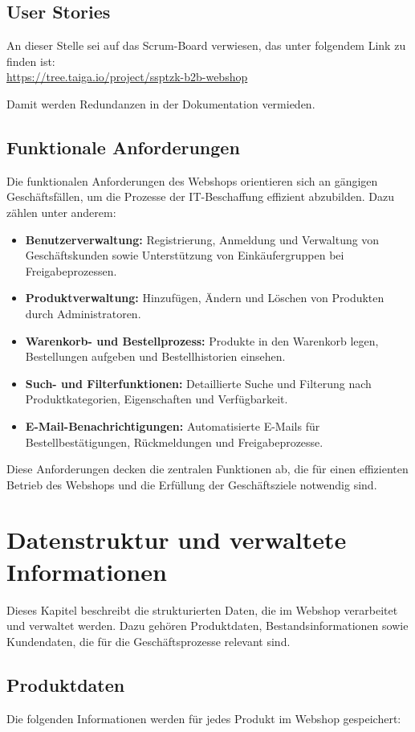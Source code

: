 \documentclass[%
	12pt,
	a4paper,
	oneside,
	parskip=full
]{scrbook}
\begin{document}
\section{User Stories}
An dieser Stelle sei auf das Scrum-Board verwiesen, das unter folgendem Link zu finden ist: \\
\url{https://tree.taiga.io/project/ssptzk-b2b-webshop}

Damit werden Redundanzen in der Dokumentation vermieden.

\section{Funktionale Anforderungen}
Die funktionalen Anforderungen des Webshops orientieren sich an gängigen Geschäftsfällen, um die Prozesse der IT-Beschaffung effizient abzubilden. Dazu zählen unter anderem:
\begin{itemize}
	\item \textbf{Benutzerverwaltung:} Registrierung, Anmeldung und Verwaltung von Geschäftskunden sowie Unterstützung von Einkäufergruppen bei Freigabeprozessen.
	\item \textbf{Produktverwaltung:} Hinzufügen, Ändern und Löschen von Produkten durch Administratoren.
	\item \textbf{Warenkorb- und Bestellprozess:} Produkte in den Warenkorb legen, Bestellungen aufgeben und Bestellhistorien einsehen.
	\item \textbf{Such- und Filterfunktionen:} Detaillierte Suche und Filterung nach Produktkategorien, Eigenschaften und Verfügbarkeit.
	\item \textbf{E-Mail-Benachrichtigungen:} Automatisierte E-Mails für Bestellbestätigungen, Rückmeldungen und Freigabeprozesse.
\end{itemize}

Diese Anforderungen decken die zentralen Funktionen ab, die für einen effizienten Betrieb des Webshops und die Erfüllung der Geschäftsziele notwendig sind.

\chapter{Datenstruktur und verwaltete Informationen}
Dieses Kapitel beschreibt die strukturierten Daten, die im Webshop verarbeitet und verwaltet werden. Dazu gehören Produktdaten, Bestandsinformationen sowie Kundendaten, die für die Geschäftsprozesse relevant sind.

\section{Produktdaten}
Die folgenden Informationen werden für jedes Produkt im Webshop gespeichert:
\end{document}
